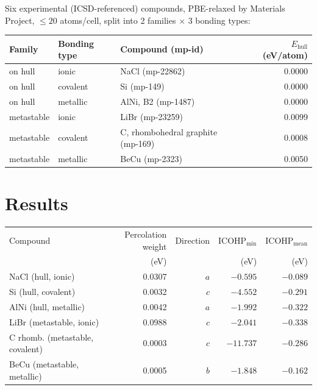 \documentclass[11pt,a4paper]{article}
\begin{document}
Six experimental (ICSD-referenced) compounds, PBE-relaxed by Materials
Project, $\leq 20$ atoms/cell, split into 2 families $\times$ 3 bonding
types:

\begin{center}
\begin{tabular}{@{}lllr@{}}
\toprule
Family & Bonding type & Compound (mp-id) & $E_\text{hull}$ (eV/atom) \\
\midrule
on hull       & ionic      & NaCl (mp-22862)               & 0.0000 \\
on hull       & covalent   & Si (mp-149)                   & 0.0000 \\
on hull       & metallic   & AlNi, B2 (mp-1487)            & 0.0000 \\
metastable    & ionic      & LiBr (mp-23259)                & 0.0099 \\
metastable    & covalent   & C, rhombohedral graphite (mp-169) & 0.0008 \\
metastable    & metallic   & BeCu (mp-2323)                 & 0.0050 \\
\bottomrule
\end{tabular}
\end{center}

\section{Results}

\begin{center}
\small
\begin{tabular}{@{}lrrrr@{}}
\toprule
Compound & Percolation weight & Direction & $\text{ICOHP}_\text{min}$ & $\text{ICOHP}_\text{mean}$ \\
        & (eV) & & (eV) & (eV) \\
\midrule
NaCl (hull, ionic)          & 0.0307 & $a$ & $-0.595$  & $-0.089$ \\
Si (hull, covalent)         & 0.0032 & $c$ & $-4.552$  & $-0.291$ \\
AlNi (hull, metallic)       & 0.0042 & $a$ & $-1.992$  & $-0.322$ \\
LiBr (metastable, ionic)         & 0.0988 & $c$ & $-2.041$  & $-0.338$ \\
C rhomb. (metastable, covalent)  & 0.0003 & $c$ & $-11.737$ & $-0.286$ \\
BeCu (metastable, metallic)      & 0.0005 & $b$ & $-1.848$ & $-0.162$ \\
\bottomrule
\end{tabular}
\end{center}
\end{document}
